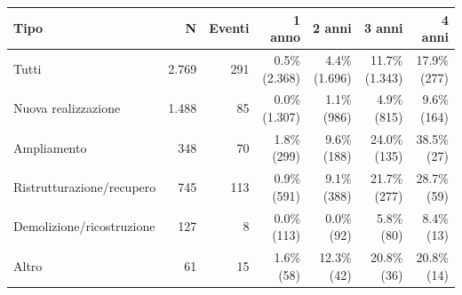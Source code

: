 \begin{tabular}{lrrrrrr}
\toprule
Tipo & N & Eventi & 1 anno & 2 anni & 3 anni & 4 anni \\
\midrule
Tutti & 2.769 & 291 & 0.5\% (2.368) & 4.4\% (1.696) & 11.7\% (1.343) & 17.9\% (277) \\
Nuova realizzazione & 1.488 & 85 & 0.0\% (1.307) & 1.1\% (986) & 4.9\% (815) & 9.6\% (164) \\
Ampliamento & 348 & 70 & 1.8\% (299) & 9.6\% (188) & 24.0\% (135) & 38.5\% (27) \\
Ristrutturazione/recupero & 745 & 113 & 0.9\% (591) & 9.1\% (388) & 21.7\% (277) & 28.7\% (59) \\
Demolizione/ricostruzione & 127 & 8 & 0.0\% (113) & 0.0\% (92) & 5.8\% (80) & 8.4\% (13) \\
Altro & 61 & 15 & 1.6\% (58) & 12.3\% (42) & 20.8\% (36) & 20.8\% (14) \\
\bottomrule
\end{tabular}
